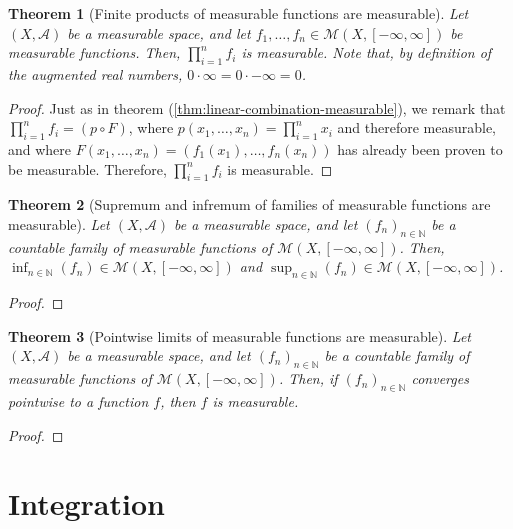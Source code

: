 \documentclass{article}
\newtheorem{theorem}{Theorem}[section]
\theoremstyle{definition}
\theoremstyle{remark}
\theoremstyle{example}
\theoremstyle{notation}
\begin{document}
\begin{theorem}[Finite products of measurable functions are measurable] \label{thm:product-measurable-functions}
		Let $(X, \mathcal{A})$ be a measurable space, and let $f_1, \dots, f_n \in \mathcal{M}(X, [-\infty, \infty])$ be measurable functions. Then, $\prod_{i=1}^n f_i$ is measurable. Note that, by definition of the augmented real numbers, $0 \cdot \infty = 0 \cdot -\infty = 0$.
\end{theorem}

\begin{proof}
		Just as in theorem (\ref{thm:linear-combination-measurable}), we remark that $\prod_{i=1}^n f_i = (p \circ F)$, where $p(x_1, \dots, x_n) = \prod_{i=1}^n x_i$  and therefore measurable, and where $F(x_1, \dots, x_n) = (f_1(x_1), \dots, f_n(x_n))$ has already been proven to be measurable. Therefore, $\prod_{i=1}^n f_i$ is measurable.
\end{proof}

\begin{theorem}[Supremum and infremum of families of measurable functions are measurable] %
		Let $(X, \mathcal{A})$ be a measurable space, and let $(f_n)_{n \in \mathbb{N}}$ be a countable family of measurable functions of $\mathcal{M}(X, [-\infty, \infty])$. Then, $\inf_{n \in \mathbb{N}}(f_n) \in \mathcal{M}(X, [-\infty, \infty])$ and $\sup_{n \in \mathbb{N}}(f_n) \in \mathcal{M}(X, [-\infty, \infty])$.
\end{theorem}

\begin{proof}
		
\end{proof}

\begin{theorem}[Pointwise limits of measurable functions are measurable] \label{thm:limit-measurable-is-measurable}
		Let $(X, \mathcal{A})$ be a measurable space, and let $(f_n)_{n \in \mathbb{N}}$ be a countable family of measurable functions of $\mathcal{M}(X, [-\infty, \infty])$. Then, if $(f_n)_{n \in \mathbb{N}}$ converges pointwise to a function $f$, then $f$ is measurable.
\end{theorem}

\begin{proof}
		
\end{proof}

\section{Integration}
\end{document}
